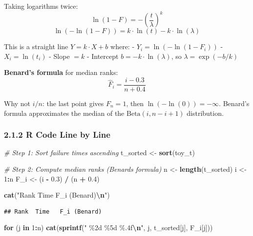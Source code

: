 \documentclass[
]{article}
\newenvironment{Shaded}{\begin{snugshade}}{\end{snugshade}}
\newcommand{\CommentTok}[1]{\textcolor[rgb]{0.56,0.35,0.01}{\textit{#1}}}
\newcommand{\ControlFlowTok}[1]{\textcolor[rgb]{0.13,0.29,0.53}{\textbf{#1}}}
\newcommand{\DecValTok}[1]{\textcolor[rgb]{0.00,0.00,0.81}{#1}}
\newcommand{\FloatTok}[1]{\textcolor[rgb]{0.00,0.00,0.81}{#1}}
\newcommand{\FunctionTok}[1]{\textcolor[rgb]{0.13,0.29,0.53}{\textbf{#1}}}
\newcommand{\NormalTok}[1]{#1}
\newcommand{\OtherTok}[1]{\textcolor[rgb]{0.56,0.35,0.01}{#1}}
\newcommand{\SpecialCharTok}[1]{\textcolor[rgb]{0.81,0.36,0.00}{\textbf{#1}}}
\newcommand{\StringTok}[1]{\textcolor[rgb]{0.31,0.60,0.02}{#1}}
\begin{document}
Taking logarithms twice:
\[\ln(1-F) = -\left(\frac{t}{\lambda}\right)^k\]
\[\ln(-\ln(1-F)) = k \cdot \ln(t) - k \cdot \ln(\lambda)\]

This is a straight line \(Y = k \cdot X + b\) where: -
\(Y_i = \ln(-\ln(1-F_i))\) - \(X_i = \ln(t_i)\) - Slope \(= k\) -
Intercept \(b = -k \cdot \ln(\lambda)\), so \(\lambda = \exp(-b/k)\)

\textbf{Benard's formula} for median ranks:
\[\hat{F}_i = \frac{i - 0.3}{n + 0.4}\]

Why not \(i/n\): the last point gives \(F_n = 1\), then
\(\ln(-\ln(0)) = -\infty\). Benard's formula approximates the median of
the \(\text{Beta}(i, n-i+1)\) distribution.

\subsubsection{2.1.2 R Code Line by Line}\label{r-code-line-by-line}

\begin{Shaded}
\begin{Highlighting}[]
\CommentTok{\# Step 1: Sort failure times ascending}
\NormalTok{t\_sorted }\OtherTok{\textless{}{-}} \FunctionTok{sort}\NormalTok{(toy\_t)}

\CommentTok{\# Step 2: Compute median ranks (Benard\textquotesingle{}s formula)}
\NormalTok{n }\OtherTok{\textless{}{-}} \FunctionTok{length}\NormalTok{(t\_sorted)}
\NormalTok{i }\OtherTok{\textless{}{-}} \DecValTok{1}\SpecialCharTok{:}\NormalTok{n}
\NormalTok{F\_i }\OtherTok{\textless{}{-}}\NormalTok{ (i }\SpecialCharTok{{-}} \FloatTok{0.3}\NormalTok{) }\SpecialCharTok{/}\NormalTok{ (n }\SpecialCharTok{+} \FloatTok{0.4}\NormalTok{)}

\FunctionTok{cat}\NormalTok{(}\StringTok{"Rank  Time   F\_i (Benard)}\SpecialCharTok{\textbackslash{}n}\StringTok{"}\NormalTok{)}
\end{Highlighting}
\end{Shaded}

\begin{verbatim}
## Rank  Time   F_i (Benard)
\end{verbatim}

\begin{Shaded}
\begin{Highlighting}[]
\ControlFlowTok{for}\NormalTok{ (j }\ControlFlowTok{in} \DecValTok{1}\SpecialCharTok{:}\NormalTok{n) }\FunctionTok{cat}\NormalTok{(}\FunctionTok{sprintf}\NormalTok{(}\StringTok{"  \%2d  \%5d   \%.4f}\SpecialCharTok{\textbackslash{}n}\StringTok{"}\NormalTok{, j, t\_sorted[j], F\_i[j]))}
\end{Highlighting}
\end{Shaded}
\end{document}
